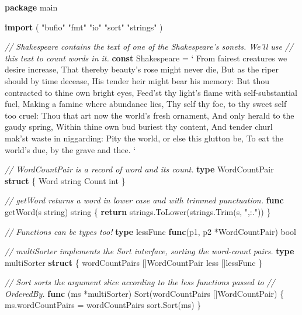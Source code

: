 \documentclass[]{book}
\newenvironment{Shaded}{\begin{snugshade}}{\end{snugshade}}
\newcommand{\CommentTok}[1]{\textcolor[rgb]{0.56,0.35,0.01}{\textit{#1}}}
\newcommand{\DataTypeTok}[1]{\textcolor[rgb]{0.13,0.29,0.53}{#1}}
\newcommand{\KeywordTok}[1]{\textcolor[rgb]{0.13,0.29,0.53}{\textbf{#1}}}
\newcommand{\NormalTok}[1]{#1}
\newcommand{\StringTok}[1]{\textcolor[rgb]{0.31,0.60,0.02}{#1}}
\begin{document}
\begin{Shaded}
\begin{Highlighting}[]
\KeywordTok{package}\NormalTok{ main}

\KeywordTok{import}\NormalTok{ (}
    \StringTok{"bufio"}
    \StringTok{"fmt"}
    \StringTok{"io"}
    \StringTok{"sort"}
    \StringTok{"strings"}
\NormalTok{)}

\CommentTok{// Shakespeare contains the text of one of the Shakespeare's sonets. We'll use}
\CommentTok{// this text to count words in it.}
\KeywordTok{const}\NormalTok{ Shakespeare = }\StringTok{`}
\StringTok{From fairest creatures we desire increase,}
\StringTok{That thereby beauty's rose might never die,}
\StringTok{But as the riper should by time decease,}
\StringTok{His tender heir might bear his memory:}
\StringTok{But thou contracted to thine own bright eyes,}
\StringTok{Feed'st thy light's flame with self-substantial fuel,}
\StringTok{Making a famine where abundance lies,}
\StringTok{Thy self thy foe, to thy sweet self too cruel:}
\StringTok{Thou that art now the world's fresh ornament,}
\StringTok{And only herald to the gaudy spring,}
\StringTok{Within thine own bud buriest thy content,}
\StringTok{And tender churl mak'st waste in niggarding:}
\StringTok{  Pity the world, or else this glutton be,}
\StringTok{  To eat the world's due, by the grave and thee.}
\StringTok{`}

\CommentTok{// WordCountPair is a record of word and its count.}
\KeywordTok{type}\NormalTok{ WordCountPair }\KeywordTok{struct}\NormalTok{ \{}
\NormalTok{    Word  }\DataTypeTok{string}
\NormalTok{    Count }\DataTypeTok{int}
\NormalTok{\}}

\CommentTok{// getWord returns a word in lower case and with trimmed punctuation.}
\KeywordTok{func}\NormalTok{ getWord(s }\DataTypeTok{string}\NormalTok{) }\DataTypeTok{string}\NormalTok{ \{}
    \KeywordTok{return}\NormalTok{ strings.ToLower(strings.Trim(s, }\StringTok{",:."}\NormalTok{))}
\NormalTok{\}}

\CommentTok{// Functions can be types too!}
\KeywordTok{type}\NormalTok{ lessFunc }\KeywordTok{func}\NormalTok{(p1, p2 *WordCountPair) }\DataTypeTok{bool}

\CommentTok{// multiSorter implements the Sort interface, sorting the word-count pairs.}
\KeywordTok{type}\NormalTok{ multiSorter }\KeywordTok{struct}\NormalTok{ \{}
\NormalTok{    wordCountPairs []WordCountPair}
\NormalTok{    less           []lessFunc}
\NormalTok{\}}

\CommentTok{// Sort sorts the argument slice according to the less functions passed to}
\CommentTok{// OrderedBy.}
\KeywordTok{func}\NormalTok{ (ms *multiSorter) Sort(wordCountPairs []WordCountPair) \{}
\NormalTok{    ms.wordCountPairs = wordCountPairs}
\NormalTok{    sort.Sort(ms)}
\NormalTok{\}}


\end{Highlighting}
\end{Shaded}
\end{document}
